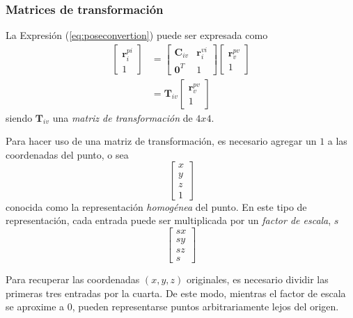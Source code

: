 \subsubsection{Matrices de transformación}
La Expresión (\ref{eq:poseconvertion}) puede ser expresada como
\begin{align}
    \begin{bmatrix}
        \bm{r}_i^{pi} \\
        1
    \end{bmatrix}
    &=
    \begin{bmatrix}
        \bm{C}_{iv} & \bm{r}_i^{vi} \\
        \bm{0}^T & 1
    \end{bmatrix}
    \begin{bmatrix}
        \bm{r}_v^{pv} \\
        1
    \end{bmatrix} \\
    &=
    \bm{T}_{iv}
    \begin{bmatrix}
        \bm{r}_v^{pv} \\
        1
    \end{bmatrix}
\end{align}
siendo $\bm{T}_{iv}$ una \textit{matriz de transformación} de $4x4$.

Para hacer uso de una matriz de transformación, es necesario agregar un $1$ a las coordenadas del punto, o sea
\begin{equation}
    \begin{bmatrix}
        x \\
        y \\
        z \\
        1
    \end{bmatrix}
\end{equation}
conocida como la representación \textit{homogénea} del punto. En este tipo de representación, cada entrada puede ser multiplicada por un \textit{factor de escala}, $s$
\begin{equation}
    \begin{bmatrix}
        sx  \\
        sy  \\
        sz  \\
        s
    \end{bmatrix}
\end{equation}

Para recuperar las coordenadas $(x,y,z)$ originales, es necesario dividir las primeras tres entradas por la cuarta. De este modo, mientras el factor de escala se aproxime a $0$, pueden representarse puntos arbitrariamente lejos del origen.

